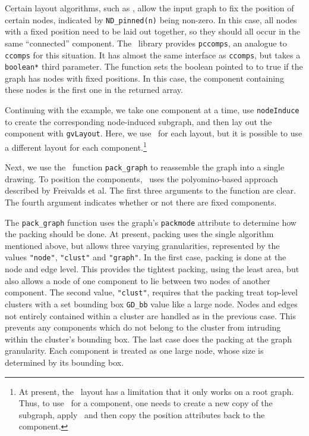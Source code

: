 Certain layout algorithms, such as \neato, allow the input graph to
fix the position of certain nodes, indicated by {\tt ND\_pinned(n)} being
non-zero. In this case, all nodes with a
fixed position need to be laid out together, so they should all
occur in the same ``connected'' component. The \pack\ library 
provides {\tt pccomps}, an analogue to {\tt ccomps} for this
situation. It has almost the same interface as {\tt ccomps}, but takes
a {\tt boolean*} third parameter. The function sets the boolean pointed
to to true if the graph has nodes with fixed positions. In this case,
the component containing these nodes is the first one in the returned array.

Continuing with the example,
we take one component at a time, use {\tt nodeInduce} to create the 
corresponding node-induced subgraph, and then lay out the component
with {\tt gvLayout}. Here, we use \neato\ for each layout, but it
is possible to use a different layout for each component.\footnote{
At present, the \dot\ layout has a limitation that it only works on
a root graph. Thus, to use \dot\ for a component, one needs to create
a new copy of the subgraph, apply \dot\, and then copy the position
attributes back to the component.}

Next, we use the \pack\ function {\tt pack\_graph} to reassemble
the graph into a single drawing. To position the components, \pack\
uses the polyomino-based approach described by
Freivalds et al\cite{pack}. The first three arguments to the
function are clear. The fourth argument indicates whether or not
there are fixed components.

The {\tt pack\_graph} function uses the graph's {\tt packmode}
attribute to determine how the packing should be done. At
present, packing uses the single algorithm mentioned above, but allows
three varying granularities, represented by the values {\tt "node"},
{\tt "clust"} and {\tt "graph"}. In the first case, packing is done at
the node and edge level. This provides the tightest packing, using the
least area, but also allows a node of one component to lie between
two nodes of another component. The second value, {\tt "clust"}, 
requires that the packing treat top-level clusters with a set
bounding box {\tt GD\_bb} value like a large node. Nodes and edges not
entirely contained within a cluster are handled as in the previous
case. This prevents any components which do not belong to the cluster 
from intruding within the cluster's bounding box. The 
last case does the packing at the graph granularity. Each component
is treated as one large node, whose size is determined by its
bounding box.

